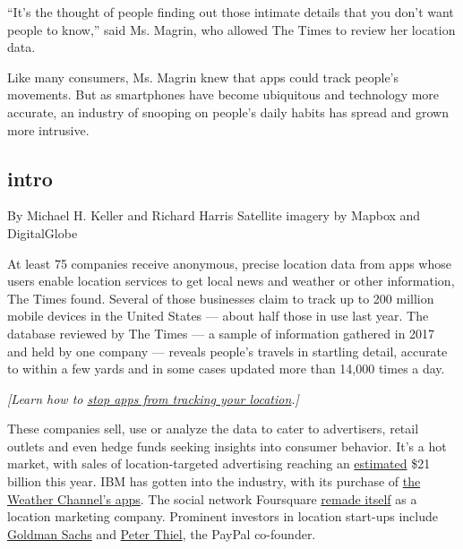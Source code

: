 ``It's the thought of people finding out those intimate details that you
don't want people to know,'' said Ms. Magrin, who allowed The Times to
review her location data.

Like many consumers, Ms. Magrin knew that apps could track people's
movements. But as smartphones have become ubiquitous and technology more
accurate, an industry of snooping on people's daily habits has spread
and grown more intrusive.

\hypertarget{intro}{%
\subsection{intro}\label{intro}}

By Michael H. Keller and Richard Harris \textbar{} Satellite imagery by
Mapbox and DigitalGlobe

At least 75 companies receive anonymous, precise location data from apps
whose users enable location services to get local news and weather or
other information, The Times found. Several of those businesses claim to
track up to 200 million mobile devices in the United States --- about
half those in use last year. The database reviewed by The Times --- a
sample of information gathered in 2017 and held by one company ---
reveals people's travels in startling detail, accurate to within a few
yards and in some cases updated more than 14,000 times a day.

\emph{{[}Learn how to
\href{https://www.nytimes.com/2018/12/10/technology/prevent-location-data-sharing.html?action=click\&module=Intentional\&pgtype=Article}{stop
apps from tracking your location}.{]}}

These companies sell, use or analyze the data to cater to advertisers,
retail outlets and even hedge funds seeking insights into consumer
behavior. It's a hot market, with sales of location-targeted advertising
reaching an
\href{https://shop.biakelsey.com/product/2018-u-s-local-mobile-local-social-ad-forecast}{estimated}
\$21 billion this year. IBM has gotten into the industry, with its
purchase of
\href{https://www.ibm.com/case-studies/mcdonalds-watson-advertising}{the
Weather Channel's apps}. The social network Foursquare
\href{https://venturebeat.com/2018/10/02/foursquare-raises-33-million-for-ad-and-location-analytics/}{remade
itself} as a location marketing company. Prominent investors in location
start-ups include
\href{https://www.businesswire.com/news/home/20180518005397/en/Cuebiq-Raises-27-Million-Growth-Capital}{Goldman
Sachs} and
\href{https://blog.safegraph.com/safegraph-raises-16-million-series-a-e8e88eeb7beb}{Peter
Thiel}, the PayPal co-founder.

